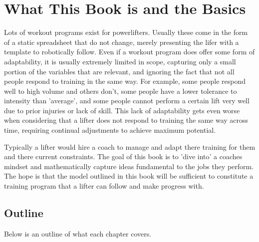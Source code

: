 \chapter{What This Book is and the Basics}

Lots of workout programs exist for powerlifters. Usually these come in the form of a static spreadsheet that do not change, merely presenting the lifer with a template to robotically follow. Even if a workout program does offer some form of adaptability, it is usually extremely limited in scope, capturing only a small portion of the variables that are relevant, and ignoring the fact that not all people respond to training in the same way. For example, some people respond well to high volume and others don't, some people have a lower tolerance to intensity than 'average', and some people cannot perform a certain lift very well due to prior injuries or lack of skill. This lack of adaptability gets even worse when considering that a lifter does not respond to training the same way across time, requiring continual adjustments to achieve maximum potential.

Typically a lifter would hire a coach to manage and adapt there training for them and there current constraints. The goal of this book is to 'dive into' a coaches mindset and mathematically capture ideas fundamental to the jobs they perform. The hope is that the model outlined in this book will be sufficient to constitute a training program that a lifter can follow and make progress with.

\section{Outline}
\label{sec:P1_Outline}

Below is an outline of what each chapter covers.

